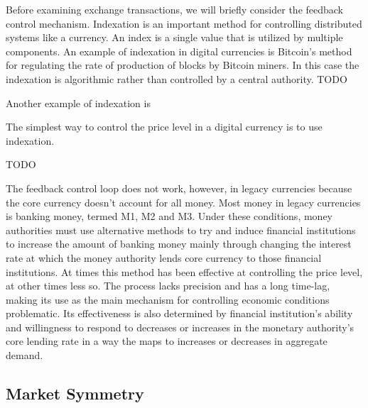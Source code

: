 Before examining exchange transactions, we will briefly consider the feedback control mechanism.
Indexation is an important method for controlling distributed systems like a currency. An index is a
single value that is utilized by multiple components. An example of indexation in digital currencies
is Bitcoin's method for regulating the rate of production of blocks by Bitcoin miners. In this case
the indexation is algorithmic rather than controlled by a central authority. TODO

Another example of indexation is 

The simplest way to control the price level in a digital currency is to use indexation.





TODO

The feedback control loop does not work, however, in legacy currencies because the core currency
doesn't account for all money. Most money in legacy currencies is banking money, termed M1, M2 and
M3. Under these conditions, money authorities must use alternative methods to try and induce
financial institutions to increase the amount of banking money mainly through changing the interest
rate at which the money authority lends core currency to those financial institutions. At times this
method has been effective at controlling the price level, at other times less so. The process lacks
precision and has a long time-lag, making its use as the main mechanism for controlling economic
conditions problematic. Its effectiveness is also determined by financial institution's ability and
willingness to respond to decreases or increases in the monetary authority's core lending rate in a
way the maps to increases or decreases in aggregate demand.

\subsection{Market Symmetry}

